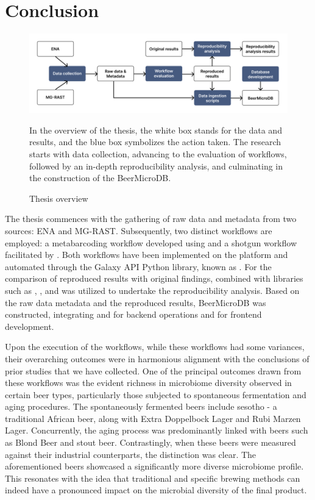 \section{Conclusion}

    \begin{figure}[H]
        \centering
        \includegraphics[scale=0.5]{images/overview.png}
        \caption{Thesis overview}
        \small In the overview of the thesis, the white box stands for the data and results, and the blue box symbolizes the action taken. The research starts with data collection, advancing to the evaluation of workflows, followed by an in-depth reproducibility analysis, and culminating in the construction of the BeerMicroDB.
        \label{fig:conclusion:overview}
    \end{figure}

    The thesis commences with the gathering of raw data and metadata from two sources: ENA and MG-RAST. Subsequently, two distinct workflows are employed: a metabarcoding workflow developed using  and a shotgun workflow facilitated by . Both workflows have been implemented on the  platform and automated through the Galaxy API Python library, known as . For the comparison of reproduced results with original findings,  combined with  libraries such as , , and  was utilized to undertake the reproducibility analysis. Based on the raw data metadata and the reproduced results, BeerMicroDB was constructed, integrating  and  for backend operations and  for frontend development.
    
    Upon the execution of the workflows, while these workflows had some variances, their overarching outcomes were in harmonious alignment with the conclusions of prior studies that we have collected. One of the principal outcomes drawn from these workflows was the evident richness in microbiome diversity observed in certain beer types, particularly those subjected to spontaneous fermentation and aging procedures. The spontaneously fermented beers include sesotho - a traditional African beer, along with Extra Doppelbock Lager and Rubi Marzen Lager. Concurrently, the aging process was predominantly linked with beers such as Blond Beer and stout beer. Contrastingly, when these beers were measured against their industrial counterparts, the distinction was clear. The aforementioned beers showcased a significantly more diverse microbiome profile. This resonates with the idea that traditional and specific brewing methods can indeed have a pronounced impact on the microbial diversity of the final product.
    
